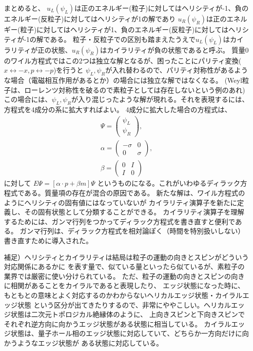 \documentclass{article}
\begin{document}
まとめると、
$u_L(\psi_L)$は正のエネルギー(粒子)に対してはヘリシティが-1、負のエネルギー(反粒子)に対してはヘリシティが1の解であり
$u_R(\psi_R)$は正のエネルギー(粒子)に対してはヘリシティが1、負のエネルギー(反粒子)に対してはヘリシティが-1の解である。
粒子・反粒子での区別も踏まえたうえで$u_L(\psi_L)$はカイラリティが正の状態、$u_R(\psi_R)$はカイラリティが負の状態であると呼ぶ。
質量0のワイル方程式ではこの2つは独立な解となるが、困ったことにパリティ変換($x\leftrightarrow -x, p\leftrightarrow-p$)を行うと
$\psi_L, \psi_R$が入れ替わるので、パリティ対称性があるような場合（電磁相互作用があるとか）の場合には独立な解ではなくなる。
(Weyl粒子は、ローレンツ対称性を破るので素粒子としては存在しないという例のあれ)
この場合には、$\psi_L, \psi_R$が入り混じったような解が現れる。それを表現するには、方程式を4成分の系に拡大すればよい。
4成分に拡大した場合の方程式は、
\begin{eqnarray}
\Psi=\left( 
 \begin{array}{c}
	\psi_L  \\
	\psi_R
 \end{array}
\right), \\
\alpha=\left( 
 \begin{array}{cc}
	-\sigma &  0 \\
	0 & \sigma
 \end{array}
\right), \\
\beta=\left( 
 \begin{array}{cc}
	0 &  I \\
	I & 0
 \end{array}
\right)
\end{eqnarray}
に対して
$E\Psi=[\alpha \cdot p+\beta m]\Psi$
というものになる。これがいわゆるディラック方程式である。質量項の存在が混合の原因である。
新たな解は、ワイル方程式のようにヘリシティの固有値にはなっていないが
カイラリティ演算子を新たに定義し、その固有状態として分類することができる。
カイラリティ演算子を理解するためには、ガンマ行列をつかってディラック方程式を書き直すと便利である。
ガンマ行列は、ディラック方程式を相対論ぽく（時間を特別扱いしない）書き直すために導入された。


補足）ヘリシティとカイラリティは結局は粒子の運動の向きとスピンがどういう対応関係にあるかに
を表す量で、似ている量といったら似ているが、素粒子の業界では厳密に使い分けられている。
ただ、粒子の運動の向きとスピンの向きに相関があることをカイラルであると表現したり、
エッジ状態になった時に、もともとの意味とよく対応するのかわからないヘリカルエッジ状態・カイラルエッジ状態
という区分が出てきたりするので、非常にややこしい。ヘリカルエッジ状態は二次元トポロジカル絶縁体のように、
上向きスピンと下向きスピンでそれぞれ逆方向に向かうエッジ状態がある状態に相当している。
カイラルエッジ状態は、量子ホール相のエッジ状態に対応していて、どちらか一方向だけに向かうようなエッジ状態が
ある状態に対応している。
\end{document}
